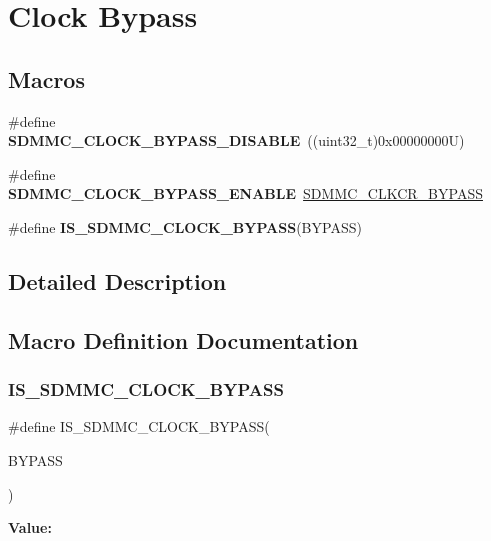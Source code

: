 \hypertarget{group___s_d_m_m_c___l_l___clock___bypass}{}\section{Clock Bypass}
\label{group___s_d_m_m_c___l_l___clock___bypass}
\subsection*{Macros}
\begin{DoxyCompactItemize}
\item 
\mbox{\label{group___s_d_m_m_c___l_l___clock___bypass_ga45790921c643ef25d574e3ffcce7643a}} 
\#define {\bfseries S\+D\+M\+M\+C\+\_\+\+C\+L\+O\+C\+K\+\_\+\+B\+Y\+P\+A\+S\+S\+\_\+\+D\+I\+S\+A\+B\+LE}~((uint32\+\_\+t)0x00000000\+U)
\item 
\mbox{\label{group___s_d_m_m_c___l_l___clock___bypass_gae10b23a76b8d9e76da6aba1722c4d9c3}} 
\#define {\bfseries S\+D\+M\+M\+C\+\_\+\+C\+L\+O\+C\+K\+\_\+\+B\+Y\+P\+A\+S\+S\+\_\+\+E\+N\+A\+B\+LE}~\mbox{\hyperlink{group___peripheral___registers___bits___definition_ga28d168ec6bd3d9524bb9787397b8d351}{S\+D\+M\+M\+C\+\_\+\+C\+L\+K\+C\+R\+\_\+\+B\+Y\+P\+A\+SS}}
\item 
\#define {\bfseries I\+S\+\_\+\+S\+D\+M\+M\+C\+\_\+\+C\+L\+O\+C\+K\+\_\+\+B\+Y\+P\+A\+SS}(B\+Y\+P\+A\+SS)
\end{DoxyCompactItemize}


\subsection{Detailed Description}


\subsection{Macro Definition Documentation}
\mbox{\label{group___s_d_m_m_c___l_l___clock___bypass_ga48ab1212070384e2ea3a3fae91aadb56}} 
\subsubsection{\texorpdfstring{IS\_SDMMC\_CLOCK\_BYPASS}{IS\_SDMMC\_CLOCK\_BYPASS}}
{\footnotesize\ttfamily \#define I\+S\+\_\+\+S\+D\+M\+M\+C\+\_\+\+C\+L\+O\+C\+K\+\_\+\+B\+Y\+P\+A\+SS(\begin{DoxyParamCaption}\item[{}]{B\+Y\+P\+A\+SS }\end{DoxyParamCaption})}

{\bfseries Value\+:}
\begin{DoxyCode}{0}

\end{DoxyCode}

